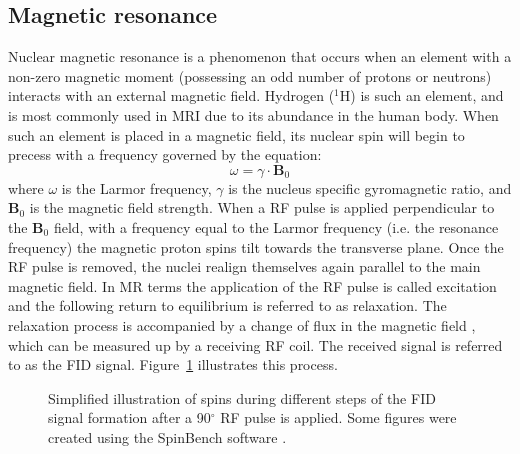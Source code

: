 \subsection{Magnetic resonance}
Nuclear magnetic resonance is a phenomenon that occurs when an element with a non-zero magnetic moment (possessing an odd number of protons or neutrons) interacts with an external magnetic field. Hydrogen ($^1$H) is such an element, and is most commonly used in MRI due to its abundance in the human body. When such an element is placed in a magnetic field, its nuclear spin will begin to precess with a frequency governed by the equation:
\begin{equation}
\omega =\gamma \cdot \mathbf{B}_0 
\end{equation}
where $\omega$ is the Larmor frequency, $\gamma$ is the nucleus specific gyromagnetic ratio, and $\mathbf{B}_0$ is the magnetic field strength. When a \gls{RF} pulse is applied perpendicular to the $\mathbf{B}_0$ field, with a frequency equal to the Larmor frequency (i.e. the resonance frequency) the magnetic proton spins tilt towards the transverse plane. Once the \gls{RF} pulse is removed, the nuclei realign themselves again parallel to the main magnetic field. In MR terms the application of the \gls{RF} pulse is called excitation and the following return to equilibrium is referred to as relaxation. The relaxation process is accompanied by a change of flux in the magnetic field , which can be measured up by a receiving \gls{RF} coil. The received signal is referred to as the \gls{FID} signal. Figure~\ref{fig:chapter2 spin FIDs} illustrates this process. 

\begin{figure}[H]
\centering
{}
\caption{Simplified illustration of spins during different steps of the FID signal formation after a 90$^\circ$ RF pulse is applied. Some figures were created using the SpinBench software \citep{Overall:2007}.}
\label{fig:chapter2 spin FIDs}
\end{figure}

